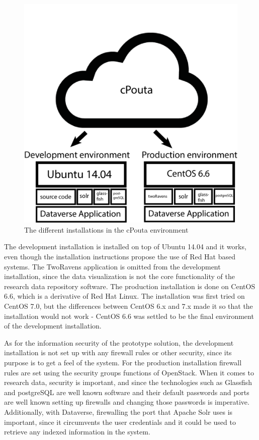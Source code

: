 \begin{figure}
    \begin{centering}
        \includegraphics[width=\textwidth]{images/cpouta2}
    \end{centering}
    \caption{The different installations in the cPouta environment}
    \label{fig:cpouta}
\end{figure}

The development installation is installed on top of Ubuntu 14.04 and it
works, even though the installation instructions propose the use of Red Hat
based systems. The TwoRavens application is omitted from the development
installation, since the data visualization is not the core functionality of
the research data repository software. The production installation is done
on CentOS 6.6, which is a derivative of Red Hat Linux. The installation was
first tried on CentOS 7.0, but the differences between CentOS 6.x and 7.x made
it so that the installation would not work - CentOS 6.6 was settled to be the
final environment of the development installation.

As for the information security of the prototype solution, the development
installation is not set up with any firewall rules or other security, since
its purpose is to get a feel of the system. For the production installation
firewall rules are set using the security groups functions of OpenStack.
When it comes to research data, security is important, and since the
technologies such as Glassfish and postgreSQL are well known software and
their default passwords and ports are well known setting up firewalls and
changing those passwords is imperative. Additionally, with Dataverse,
firewalling the port that Apache Solr uses is important, since it circumvents
the user credentials and it could be used to retrieve any indexed information
in the system.

